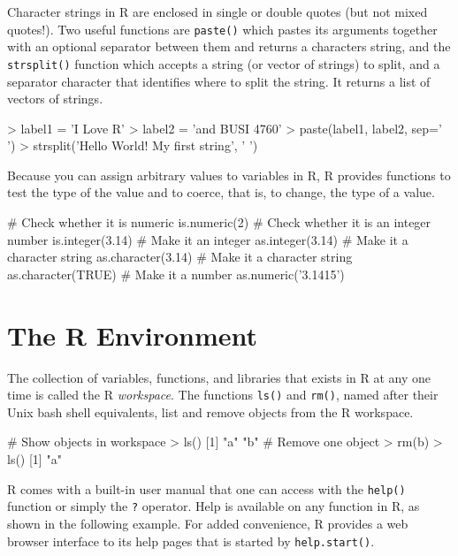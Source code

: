 Character strings in R are enclosed in single or double quotes (but not mixed quotes!). Two useful functions are \texttt{paste()} which pastes its arguments together with an optional separator between them and returns a characters string, and the \texttt{strsplit()} function which accepts a string (or vector of strings) to split, and a separator character that identifies where to split the string. It returns a list of vectors of strings.

\begin{samepage}
\begin{Rcode}
> label1 = 'I Love R'
> label2 = 'and BUSI 4760'
> paste(label1, label2, sep=' ')
> strsplit('Hello World! My first string', ' ')
\end{Rcode}
\end{samepage}

Because you can assign arbitrary values to variables in R, R provides functions to test the type of the value and to coerce, that is, to change, the type of a value.

\begin{samepage}
\begin{Rcode}
# Check whether it is numeric
is.numeric(2)
# Check whether it is an integer number
is.integer(3.14)
# Make it an integer
as.integer(3.14)
# Make it a character string
as.character(3.14)
# Make it a character string
as.character(TRUE)
# Make it a number
as.numeric('3.1415')
\end{Rcode}
\end{samepage}

\section{The R Environment}

The collection of variables, functions, and libraries that exists in R at any one time is called the R \emph{workspace}. The functions \texttt{ls()} and \texttt{rm()}, named after their Unix bash shell equivalents, list and remove objects from the R workspace.

\begin{samepage}
\begin{Rcode}
# Show objects in workspace
> ls()
[1] "a"          "b"
# Remove one object
> rm(b)
> ls()
[1] "a"
\end{Rcode}
\end{samepage}

R comes with a built-in user manual that one can access with the \texttt{help()} function or simply the \texttt{?} operator. Help is available on any function in R, as shown in the following example. For added convenience, R provides a web browser interface to its help pages that is started by \texttt{help.start()}.

